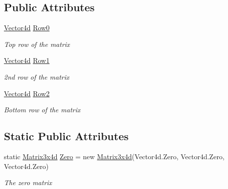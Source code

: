 \subsection*{Public Attributes}
\begin{DoxyCompactItemize}
\item 
\hyperlink{struct_open_t_k_1_1_vector4d}{Vector4d} \hyperlink{struct_open_t_k_1_1_matrix3x4d_a09b2658093cf70e2d79adc92a54e1c10}{Row0}
\begin{DoxyCompactList}\small\item\em Top row of the matrix \end{DoxyCompactList}\item 
\hyperlink{struct_open_t_k_1_1_vector4d}{Vector4d} \hyperlink{struct_open_t_k_1_1_matrix3x4d_aef944d57f7b06860e76e7882f48c4813}{Row1}
\begin{DoxyCompactList}\small\item\em 2nd row of the matrix \end{DoxyCompactList}\item 
\hyperlink{struct_open_t_k_1_1_vector4d}{Vector4d} \hyperlink{struct_open_t_k_1_1_matrix3x4d_a63d59cd2ae94d2a335ce2f21019af9d1}{Row2}
\begin{DoxyCompactList}\small\item\em Bottom row of the matrix \end{DoxyCompactList}\end{DoxyCompactItemize}
\subsection*{Static Public Attributes}
\begin{DoxyCompactItemize}
\item 
static \hyperlink{struct_open_t_k_1_1_matrix3x4d}{Matrix3x4d} \hyperlink{struct_open_t_k_1_1_matrix3x4d_a658c68810b19d74d3fd27d136eed49ae}{Zero} = new \hyperlink{struct_open_t_k_1_1_matrix3x4d}{Matrix3x4d}(Vector4d.\-Zero, Vector4d.\-Zero, Vector4d.\-Zero)
\begin{DoxyCompactList}\small\item\em The zero matrix \end{DoxyCompactList}\end{DoxyCompactItemize}
